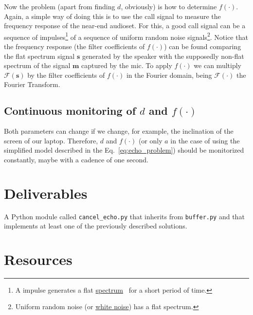 Now the problem (apart from finding $d$, obviously) is how to
determine $f(\cdot)$. Again, a simple way of doing this is to use the
call signal to measure the frequency response of the near-end
audioset. For this, a good call signal can be a sequence of
impulses\footnote{A impulse generates a flat
  \href{https://en.wikipedia.org/wiki/Spectral_density}{spectrum}~\cite{kovacevic2013fourier,Oppenheim2}
  for a short period of time.} of a sequence of uniform random noise
signals\footnote{Uniform random noise (or
  \href{https://en.wikipedia.org/wiki/White_noise}{white noise}) has a
  flat spectrum.}. Notice that the frequency response (the filter
coefficients of $f(\cdot)$) can be found comparing the flat spectrum
signal ${\mathbf s}$ generated by the speaker with the supposedly
non-flat spectrum of the signal ${\mathbf m}$ captured by the mic.  To
apply $f(\cdot)$ we can multiply ${\mathcal F}({\mathbf s})$ by the
filter coefficients of $f(\cdot)$ in the Fourier domain, being
${\mathcal F}(\cdot)$ the Fourier Transform.

\subsection{Continuous monitoring of $d$ and $f(\cdot)$}

Both parameters can change if we change, for example, the inclination
of the screen of our laptop. Therefore, $d$ and $f(\cdot)$ (or only
$a$ in the case of using the simplified model described in the
Eq.~\eqref{eq:echo_problem}) should be monitorized constantly, maybe
with a cadence of one second.

\section{Deliverables}

A Python module called \texttt{cancel\_echo.py} that inherits from
\texttt{buffer.py} and that implements at least one of the previously
described solutions.

\section{Resources}



\begin{comment}
http://www.seas.ucla.edu/dsplab/index.html
https://es.mathworks.com/help/signal/ug/echo-cancelation.html
https://dsp.stackexchange.com/questions/26617/echo-cancelling-using-autocorrelation-function
https://pypi.org/project/adaptfilt/
http://www.diva-portal.org/smash/get/diva2:280596/fulltext01
https://github.com/ThomasHaubner/e2e_dnn_ad_control_for_lin_aec
https://scicoding.com/4-ways-of-calculating-autocorrelation-in-python/
\end{comment}